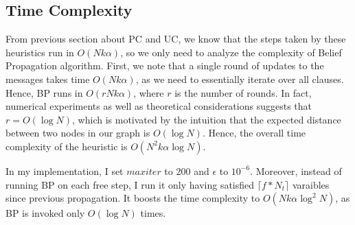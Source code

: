 \documentclass[10pt]{article}
\begin{document}
\subsection*{Time Complexity}
From previous section about PC and UC, we know that the steps taken by these heuristics run in $O(N k \alpha)$, so we only need to analyze the complexity of Belief Propagation algorithm. First, we note that a single round of updates to the messages takes time $O(N k \alpha)$, as we need to essentially iterate over all clauses. Hence, BP runs in $O(r N k \alpha)$, where $r$ is the number of rounds. In fact, numerical experiments as well as theoretical considerations suggests that $r = O(\log N)$, which is motivated by the intuition that the expected distance between two nodes in our graph is $O(\log N)$. Hence, the overall time complexity of the heuristic is $O(N^2 k \alpha \log N)$.
\par  
In my implementation, I set $maxiter$ to $200$ and $\epsilon$ to $10^{-6}$. Moreover, instead of running BP on each free step, I run it only having satisfied $\lceil f * N_t \rceil$ varaibles since previous propagation. It boosts the time complexity to $O(N k \alpha \log^2 N)$, as BP is invoked only $O(\log N)$ times.
\end{document}
